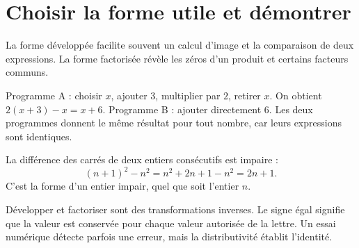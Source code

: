 \documentclass[../cours_3e.tex]{subfiles}
\begin{document}
\section{Choisir la forme utile et démontrer}
La forme développée facilite souvent un calcul d'image et la comparaison de deux expressions. La forme factorisée révèle les zéros d'un produit et certains facteurs communs.
\begin{exemple}
Programme A : choisir $x$, ajouter $3$, multiplier par $2$, retirer $x$. On obtient $2(x+3)-x=x+6$. Programme B : ajouter directement $6$. Les deux programmes donnent le même résultat pour tout nombre, car leurs expressions sont identiques.
\end{exemple}
\begin{demonstration}
La différence des carrés de deux entiers consécutifs est impaire :
\[(n+1)^2-n^2=n^2+2n+1-n^2=2n+1.\]
C'est la forme d'un entier impair, quel que soit l'entier $n$.
\end{demonstration}
\begin{retenir}
Développer et factoriser sont des transformations inverses. Le signe égal signifie que la valeur est conservée pour chaque valeur autorisée de la lettre. Un essai numérique détecte parfois une erreur, mais la distributivité établit l'identité.
\end{retenir}
\end{document}
